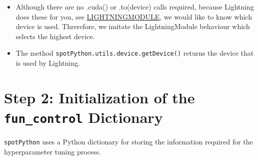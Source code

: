 \documentclass[
  letterpaper,
  DIV=11,
  numbers=noendperiod]{scrreprt}
\providecommand{\tightlist}{%
  \setlength{\itemsep}{0pt}\setlength{\parskip}{0pt}}\usepackage{longtable,booktabs,array}
\begin{document}
\begin{tcolorbox}[enhanced jigsaw, coltitle=black, bottomrule=.15mm, breakable, toprule=.15mm, colframe=quarto-callout-note-color-frame, title=\textcolor{quarto-callout-note-color}{\faInfo}\hspace{0.5em}{Note: Device selection}, colbacktitle=quarto-callout-note-color!10!white, opacityback=0, left=2mm, leftrule=.75mm, colback=white, rightrule=.15mm, bottomtitle=1mm, toptitle=1mm, titlerule=0mm, arc=.35mm, opacitybacktitle=0.6]

\begin{itemize}
\tightlist
\item
  Although there are no .cuda() or .to(device) calls required, because
  Lightning does these for you, see
  \href{https://lightning.ai/docs/pytorch/stable/common/lightning_module.html}{LIGHTNINGMODULE},
  we would like to know which device is used. Threrefore, we imitate the
  LightningModule behaviour which selects the highest device.
\item
  The method \texttt{spotPython.utils.device.getDevice()} returns the
  device that is used by Lightning.
\end{itemize}

\end{tcolorbox}

\section{\texorpdfstring{Step 2: Initialization of the
\texttt{fun\_control}
Dictionary}{Step 2: Initialization of the fun\_control Dictionary}}\label{step-2-initialization-of-the-fun_control-dictionary-1}

\texttt{spotPython} uses a Python dictionary for storing the information
required for the hyperparameter tuning process.
\end{document}
